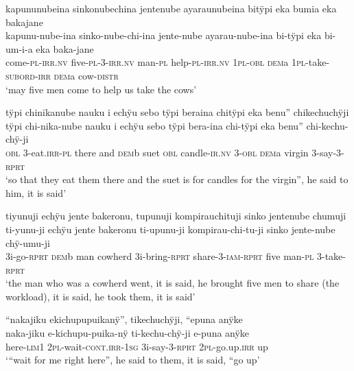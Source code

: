 \ea%
\begingl 
\glpreamble kapununubeina sinkonubechina jentenube ayaraunubeina bitÿpi eka bumia eka bakajane\\
\gla kapunu-nube-ina sinko-nube-chi-ina jente-nube ayarau-nube-ina bi-tÿpi eka bi-um-i-a eka baka-jane\\ 
\glb come-\textsc{pl}-\textsc{irr.nv} five-\textsc{pl}-3-\textsc{irr.nv} man-\textsc{pl} help-\textsc{pl}-\textsc{irr.nv} 1\textsc{pl}-\textsc{obl} \textsc{dem}a 1\textsc{pl}-take-\textsc{subord}-\textsc{irr} \textsc{dem}a cow-\textsc{distr}\\ 
\glft ‘may five men come to help us take the cows’\\ 
\endgl
\xe


\ea%
\begingl 
\glpreamble tÿpi chinikanube nauku i echÿu sebo tÿpi beraina chitÿpi eka benu” chikechuchÿji\\
\gla tÿpi chi-nika-nube nauku i echÿu sebo tÿpi bera-ina chi-tÿpi eka benu” chi-kechu-chÿ-ji\\ 
\glb \textsc{obl} 3-eat.\textsc{irr}-\textsc{pl} there and \textsc{dem}b suet \textsc{obl} candle-\textsc{ir.nv} 3-\textsc{obl} \textsc{dem}a virgin 3-say-3-\textsc{rprt}\\ 
\glft ‘so that they eat them there and the suet is for candles for the virgin”, he said to him, it is said’\\ 
\endgl
\xe

\ea%
\begingl 
\glpreamble tiyunuji echÿu jente bakeronu, tupunuji kompirauchituji sinko jentenube chumuji\\
\gla ti-yunu-ji echÿu jente bakeronu ti-upunu-ji kompirau-chi-tu-ji sinko jente-nube chÿ-umu-ji\\ 
\glb 3i-go-\textsc{rprt} \textsc{dem}b man cowherd 3i-bring-\textsc{rprt} share-3-\textsc{iam}-\textsc{rprt} five man-\textsc{pl} 3-take-\textsc{rprt}\\ 
\glft ‘the man who was a cowherd went, it is said, he brought five men to share (the workload), it is said, he took them, it is said’\\ 
\endgl
\xe

\ea%
\begingl 
\glpreamble “nakajiku ekichupupuikanÿ”, tikechuchÿji, “epuna anÿke\\
\gla naka-jiku e-kichupu-puika-nÿ ti-kechu-chÿ-ji e-puna anÿke\\ 
\glb here-\textsc{lim}1 2\textsc{pl}-wait-\textsc{cont.irr}-1\textsc{sg} 3i-say-3-\textsc{rprt} 2\textsc{pl}-go.up.\textsc{irr} up\\ 
\glft ‘“wait for me right here”, he said to them, it is said, “go up’\\ 
\endgl
\xe

